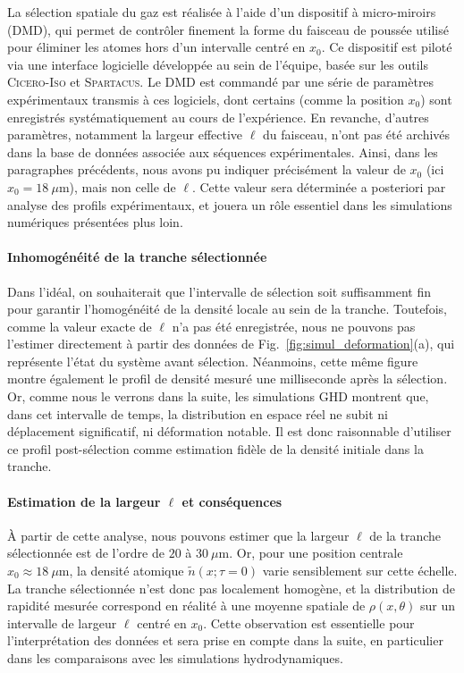 La sélection spatiale du gaz est réalisée à l’aide d’un dispositif à micro-miroirs (DMD), qui permet de contrôler finement la forme du faisceau de poussée utilisé pour éliminer les atomes hors d’un intervalle centré en $x_0$. Ce dispositif est piloté via une interface logicielle développée au sein de l’équipe, basée sur les outils \textsc{Cicero-Iso} et \textsc{Spartacus}. Le DMD est commandé par une série de paramètres expérimentaux transmis à ces logiciels, dont certains (comme la position $x_0$) sont enregistrés systématiquement au cours de l’expérience. En revanche, d'autres paramètres, notamment la largeur effective $\ell$ du faisceau, n’ont pas été archivés dans la base de données associée aux séquences expérimentales. Ainsi, dans les paragraphes précédents, nous avons pu indiquer précisément la valeur de $x_0$ (ici $x_0 = 18~\mu\mathrm{m}$), mais non celle de $\ell$. Cette valeur sera déterminée a posteriori par analyse des profils expérimentaux, et jouera un rôle essentiel dans les simulations numériques présentées plus loin.

\medskip
\paragraph{Inhomogénéité de la tranche sélectionnée}

Dans l'idéal, on souhaiterait que l’intervalle de sélection soit suffisamment fin pour garantir l’homogénéité de la densité locale au sein de la tranche. Toutefois, comme la valeur exacte de $\ell$ n’a pas été enregistrée, nous ne pouvons pas l’estimer directement à partir des données de Fig.~\ref{fig:simul_deformation}(a), qui représente l’état du système avant sélection. Néanmoins, cette même figure montre également le profil de densité mesuré une milliseconde après la sélection. Or, comme nous le verrons dans la suite, les simulations GHD montrent que, dans cet intervalle de temps, la distribution en espace réel ne subit ni déplacement significatif, ni déformation notable. Il est donc raisonnable d’utiliser ce profil post-sélection comme estimation fidèle de la densité initiale dans la tranche.

\medskip
\paragraph{Estimation de la largeur $\ell$ et conséquences}

À partir de cette analyse, nous pouvons estimer que la largeur $\ell$ de la tranche sélectionnée est de l’ordre de $20$ à $30~\mu\mathrm{m}$. Or, pour une position centrale $x_0 \approx 18~\mu\mathrm{m}$, la densité atomique $\tilde{n}(x ; \tau = 0 )$ varie sensiblement sur cette échelle. La tranche sélectionnée n’est donc pas localement homogène, et la distribution de rapidité mesurée correspond en réalité à une moyenne spatiale de $\rho(x,\theta)$ sur un intervalle de largeur $\ell$ centré en $x_0$. Cette observation est essentielle pour l’interprétation des données et sera prise en compte dans la suite, en particulier dans les comparaisons avec les simulations hydrodynamiques.


